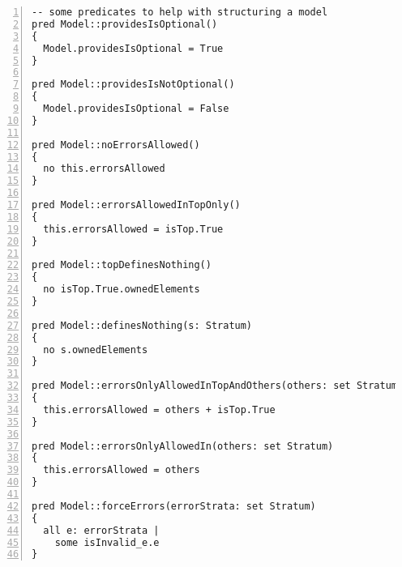 \begin{lstlisting}[caption={bb.als}, numbers=left]
-- some predicates to help with structuring a model
pred Model::providesIsOptional()
{
  Model.providesIsOptional = True
}

pred Model::providesIsNotOptional()
{
  Model.providesIsOptional = False
}

pred Model::noErrorsAllowed()
{
  no this.errorsAllowed
}

pred Model::errorsAllowedInTopOnly()
{
  this.errorsAllowed = isTop.True
}

pred Model::topDefinesNothing()
{
  no isTop.True.ownedElements
}

pred Model::definesNothing(s: Stratum)
{
  no s.ownedElements
}

pred Model::errorsOnlyAllowedInTopAndOthers(others: set Stratum)
{
  this.errorsAllowed = others + isTop.True
}

pred Model::errorsOnlyAllowedIn(others: set Stratum)
{
  this.errorsAllowed = others
}

pred Model::forceErrors(errorStrata: set Stratum)
{
  all e: errorStrata |
    some isInvalid_e.e
}

\end{lstlisting}

